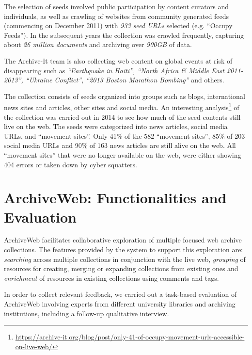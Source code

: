 \documentclass{llncs}
\begin{document}
The selection of seeds involved public participation by content
curators and individuals, as well as crawling of websites from
community generated feeds (commencing on December 2011) with
\textit{933 seed URLs} selected (e.g. ``Occupy Feeds''). In the
subsequent years the collection was crawled frequently, capturing
about \textit{26 million documents} and archiving over \textit{900GB}
of data.

The Archive-It team is also collecting web content on global events at
risk of disappearing such as \textit{``Earthquake in Haiti'', ``North
  Africa \& Middle East 2011-2013'', ``Ukraine Conflict'', ``2013
  Boston Marathon Bombing''} and others.

\endgroup

The collection consists of seeds organized into groups such as blogs,
international news sites and articles, other sites and social
media. An interesting
analysis\footnote{\url{https://archive-it.org/blog/post/only-41-of-occupy-movement-urls-accessible-on-live-web/}}
of the collection was carried out in 2014 to see how much of the seed
contents still live on the web. The seeds were categorized into news
articles, social media URLs, and ``movement sites''. Only 41\% of the
582 ``movement sites'', 85\% of 203 social media URLs and 90\% of 163
news articles are still alive on the web. All ``movement sites'' that
were no longer available on the web, were either showing 404 errors or
taken down by cyber squatters.

\section{ArchiveWeb: Functionalities and Evaluation}\label{sec:System}

ArchiveWeb facilitates collaborative exploration of multiple focused
web archive collections. The features provided by the system to
support this exploration are: \textit{searching} across multiple
collections in conjunction with the live web, \textit{grouping} of
resources for creating, merging or expanding collections from existing
ones and  \textit{enrichment} of resources in existing
collections using comments and tags. 

In order to collect relevant feedback, we carried out a task-based
evaluation of ArchiveWeb involving experts from different university libraries and archiving
institutions, including a follow-up qualitative interview. 
\end{document}
